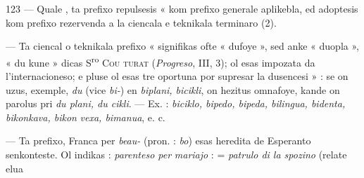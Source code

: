 \begin{VUpage}[127]{123}
 --- Quale , ta prefixo repulsesis « kom prefixo\nl
generale aplikebla, ed adoptesis kom prefixo rezervenda a\nl
la ciencala e teknikala terminaro (2).

 --- Ta ciencal o teknikala prefixo « signifikas ofte\nl
« dufoye », sed anke « duopla », « du kune » dicas S\textsuperscript{ro} \textsc{Cou}\cc
\textsc{turat} (\textit{Progreso}, III, 3); ol esas impozata da l'internacioneso;\nl
e pluse ol esas tre oportuna por supresar la dusencesi » : se\nl
on uzus, exemple, \textit{du} (vice \textit{bi-}) en \textit{biplani, bicikli}, on hezitus\nl
omnafoye, kande on parolus pri \textit{du plani, du cikli}. --- Ex. :\nl
\textit{biciklo, bipedo, bipeda, bilingua, bidenta, bikonkava, bikon}\cc
\textit{vexa, bimanua}, e. c.

 --- Ta prefixo, Franca per \textit{beau-} (pron. : \textit{bo}) esas\nl
heredita de Esperanto senkonteste. Ol indikas : \textit{parenteso per}\nl
\textit{mariajo} :  = \textit{patrulo di la spozino} (relate elua
\end{VUpage}

